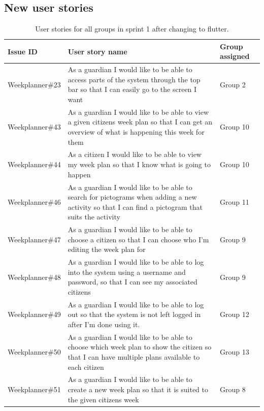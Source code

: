 \subsection{New user stories}

\begin{table}[H]
    \begin{tabular}{|p{2.8cm}|p{8cm}|p{1.6cm}|}
    \hline
    Issue ID        & User story name                                                                                                                                                          & Group assigned       \\ \hline
    Weekplanner\#23 & As a guardian I would like to be able to access parts of the system through the top bar so that I can easily go to the screen I want & Group 2            \\ \hline
    Weekplanner\#43 & As a guardian I would like to be able to view a given citizens week plan so that I can get an overview of what is happening this week for them & Group 10             \\ \hline
    Weekplanner\#44 & As a citizen I would like to be able to view my week plan so that I know what is going to happen & Group 10               \\ \hline
    Weekplanner\#46 & As a guardian I would like to be able to search for pictograms when adding a new activity so that I can find a pictogram that suits the activity & Group 11              \\ \hline
    Weekplanner\#47 & As a guardian I would like to be able to choose a citizen so that I can choose who I’m editing the week plan for  & Group 9             \\ \hline
    Weekplanner\#48 & As a guardian I would like to be able to log into the system using a username and password, so that I can see my associated citizens & Group 9             \\ \hline
    Weekplanner\#49 & As a guardian I would like to be able to log out so that the system is not left logged in after I’m done using it. & Group 12              \\ \hline
    Weekplanner\#50 & As a guardian I would like to be able to choose which week plan to show the citizen so that I can have multiple plans available to each citizen & Group 13             \\ \hline
    Weekplanner\#51 & As a guardian I would like to be able to create a new week plan so that it is suited to the given citizens week & Group 8             \\ \hline
    \end{tabular}
    \caption{User stories for all groups in sprint 1 after changing to flutter.}\label{table:user-stories-sprint-1}
\end{table}

